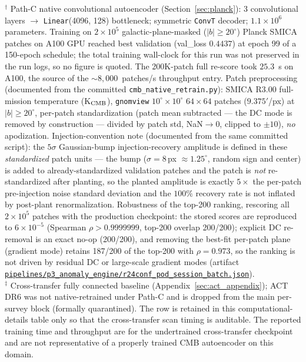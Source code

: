 \documentclass[aps,prd,twocolumn,superscriptaddress,showpacs,preprintnumbers,nofootinbib,longbibliography,floatfix]{revtex4-2}
\newcommand{\repoBase}{https://github.com/Hubify-Projects/bigbounce/blob/main}
\newcommand{\artifact}[1]{\href{\repoBase/#1}{\nolinkurl{#1}}}
\begin{document}
\begin{table}[tb]
\begin{flushleft}
{$^\dagger$ Path-C native convolutional autoencoder (Section~\ref{sec:planck}): 3 convolutional layers $\rightarrow$ \texttt{Linear}(4096, 128) bottleneck; symmetric \texttt{ConvT} decoder; $1.1\times10^6$ parameters. Training on $2\times10^5$ galactic-plane-masked ($|b|\geq20^\circ$) Planck SMICA patches on A100 GPU reached best validation (val\_loss $0.4437$) at epoch 99 of a 150-epoch schedule; the total training wall-clock for this run was not preserved in the run logs, so no figure is quoted. The 200K-patch full re-score took $25.3$~s on A100, the source of the ${\sim}8{,}000$~patches/s throughput entry. Patch preprocessing (documented from the committed \texttt{cmb\_native\_retrain.py}): SMICA R3.00 full-mission temperature (K$_{\rm CMB}$), \texttt{gnomview} $10^\circ\!\times\!10^\circ$ $64\times64$ patches ($9.375'$/px) at $|b|\geq20^\circ$, per-patch standardization (patch mean subtracted --- the DC mode is removed by construction --- divided by patch std, NaN$\to$0, clipped to $\pm10$), \emph{no} apodization. Injection-convention note (documented from the same committed script): the $5\sigma$ Gaussian-bump injection-recovery amplitude is defined in these \emph{standardized} patch units --- the bump ($\sigma = 8$\,px $\approx 1.25^\circ$, random sign and center) is added to already-standardized validation patches and the patch is \emph{not} re-standardized after planting, so the planted amplitude is exactly $5\times$ the per-patch pre-injection noise standard deviation and the $100\%$ recovery rate is not inflated by post-plant renormalization. Robustness of the top-200 ranking, rescoring all $2\times10^5$ patches with the production checkpoint: the stored scores are reproduced to $6\times10^{-5}$ (Spearman $\rho>0.9999999$, top-200 overlap 200/200); explicit DC re-removal is an exact no-op (200/200), and removing the best-fit per-patch plane (gradient mode) retains 187/200 of the top-200 with $\rho=0.973$, so the ranking is not driven by residual DC or large-scale gradient modes (artifact \artifact{pipelines/p3\_anomaly\_engine/r24conf\_pod\_session\_batch.json}).\\
$^\ddagger$ Cross-transfer fully connected baseline (Appendix~\ref{sec:act_appendix}); ACT DR6 was not native-retrained under Path-C and is dropped from the main per-survey block (formally quarantined). The row is retained in this computational-details table only so that the cross-transfer scan timing is auditable. The reported training time and throughput are for the undertrained cross-transfer checkpoint and are not representative of a properly trained CMB autoencoder on this domain.
}
\end{flushleft}
\end{table}
\end{document}
